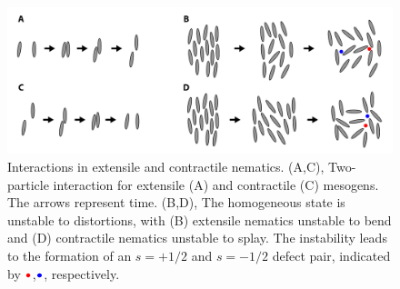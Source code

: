 \begin{figure}
  \centering
  \includegraphics{figures/C3/Ch3-Figs_ActiveInteraction.png}
  \caption{Interactions in extensile and contractile nematics.
  (A,C), Two-particle interaction for extensile (A) and contractile (C) mesogens.
  The arrows represent time.
  (B,D), The homogeneous state is unstable to distortions, with (B) extensile nematics unstable to bend and (D) contractile nematics unstable to splay.
  The instability leads to the formation of an $s = + 1/2$ and $s = -1/2$ defect pair, indicated by ${\color{red} \bullet}$,${\color{blue} \bullet}$, respectively.}\label{f:3-ActiveInteraction}
\end{figure}

